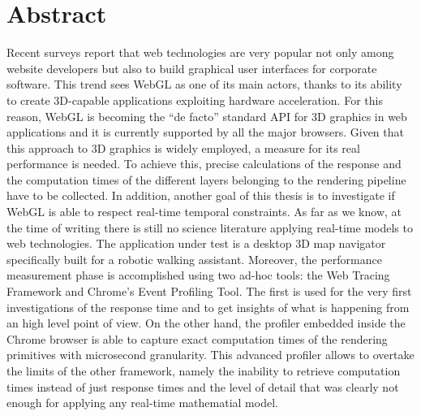 \chapter*{Abstract} \label{abstract} %

Recent surveys report that web technologies are very popular not only among
website developers but also to build graphical user interfaces for corporate software.
This trend sees WebGL as one of its main actors, thanks to its ability to create
3D-capable applications exploiting hardware acceleration. For this reason, WebGL
is becoming the ``de facto'' standard API for 3D graphics in web applications and
it is currently supported by all the major browsers.
%
Given that this approach to 3D graphics is widely employed, a measure for its
real performance is needed. To achieve this, precise calculations of the response
and the computation times of the different layers belonging to the rendering
pipeline have to be collected.
In addition, another goal of this thesis is to investigate if WebGL is able to
respect real-time temporal constraints. As far as we know, at the time of writing
there is still no science literature applying real-time models to web technologies.
%
The application under test is a desktop 3D map navigator specifically built for
a robotic walking assistant. Moreover, the performance measurement phase is
accomplished using two ad-hoc tools: the Web Tracing Framework and Chrome's
Event Profiling Tool. The first is used for the very first investigations of the
response time and to get insights of what is happening from an high level point
of view. On the other hand, the profiler embedded inside the Chrome browser is
able to capture exact computation times of the rendering primitives with
microsecond granularity. This advanced profiler allows to overtake the limits
of the other framework, namely the inability to retrieve computation times
instead of just response times and the level of detail that was clearly not
enough for applying any real-time mathematial model.

